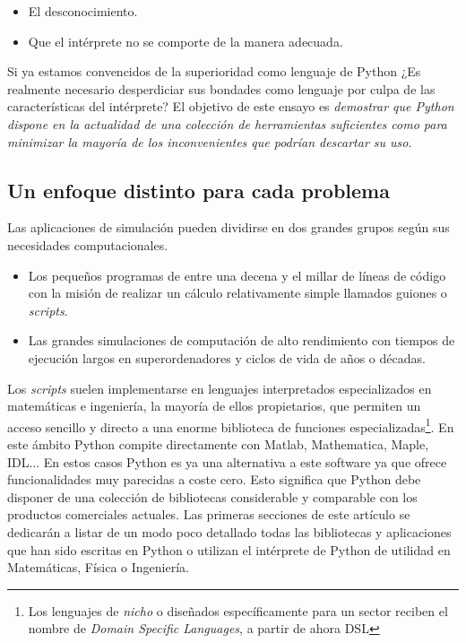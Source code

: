 \documentclass[a4paper,10pt]{article}
\begin{document}
\begin{itemize}
\item El desconocimiento.
\item Que el intérprete no se comporte de la manera adecuada.
\end{itemize}

Si ya estamos convencidos de la superioridad como lenguaje de Python
¿Es realmente necesario desperdiciar sus bondades como lenguaje por
culpa de las características del intérprete?  El objetivo de este
ensayo es \emph{demostrar que Python dispone en la actualidad de una
  colección de herramientas suficientes como para minimizar la mayoría
  de los inconvenientes que podrían descartar su uso}.

\subsection{Un enfoque distinto para cada problema}

Las aplicaciones de simulación pueden dividirse en dos grandes grupos
según sus necesidades computacionales.

\begin{itemize}
\item Los pequeños programas de entre una decena y el millar de líneas
  de código con la misión de realizar un cálculo relativamente simple
  llamados guiones o \emph{scripts}.
\item Las grandes simulaciones de computación de alto rendimiento con
  tiempos de ejecución largos en superordenadores y ciclos de vida de
  años o décadas.
\end{itemize}

Los \emph{scripts} suelen implementarse en lenguajes interpretados
especializados en matemáticas e ingeniería, la mayoría de ellos
propietarios, que permiten un acceso sencillo y directo a una enorme
biblioteca de funciones especializadas\footnote{Los lenguajes de
  \emph{nicho} o diseñados específicamente para un sector reciben el
  nombre de \emph{Domain Specific Languages}, a partir de ahora DSL}.
En este ámbito Python compite directamente con Matlab, Mathematica,
Maple, IDL... En estos casos Python es ya una alternativa a este
software ya que ofrece funcionalidades muy parecidas a coste
cero. Esto significa que Python debe disponer de una colección de
bibliotecas considerable y comparable con los productos comerciales
actuales. Las primeras secciones de este artículo se dedicarán a
listar de un modo poco detallado todas las bibliotecas y aplicaciones
que han sido escritas en Python o utilizan el intérprete de Python de
utilidad en Matemáticas, Física o Ingeniería.
\end{document}
